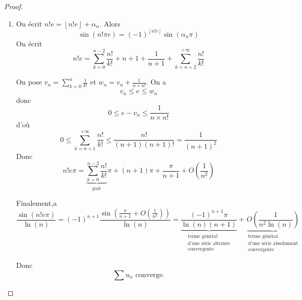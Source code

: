 \documentclass[12pt]{article}
\begin{document}
\begin{proof}
\begin{enumerate}
		\item On écrit $n!e=\left\lfloor n!e\right\rfloor+\alpha_{n}$.
		Alors 
		\begin{equation*}\sin(n!\pi e)=(-1)^{\left\lfloor n!e\right\rfloor}\sin(\alpha_{n}\pi)\end{equation*}
		On écrit 
		\begin{equation*}n!e=\sum_{k=0}^{n-2}\frac{n!}{k!}+n+1+\frac{1}{n+1}+\sum_{k=n+2}^{+\infty}\frac{n!}{k!}\end{equation*}

		On pose $v_{n}=\sum_{k=0}^{n}\frac{1}{k!}$ et $w_{n}=v_{n}+\frac{1}{n\times n!}$. On a 
		\begin{equation*}v_{n}\leqslant e\leqslant w_{n}\end{equation*}
		donc 
		\begin{equation*}0\leqslant e-v_{n}\leqslant\frac{1}{n\times n!}\end{equation*}
		d'où
		\begin{equation*}0\leqslant \sum_{k=n+1}^{+\infty}\frac{n!}{k!}\leqslant\frac{n!}{(n+1)(n+1)!}=\frac{1}{(n+1)^{2}}\end{equation*}
		Donc 
		\begin{equation*}n!e\pi = \underbrace{\sum_{k=0}^{n-2}\frac{n!}{k!}}_{\text{pair}}\pi+(n+1)\pi+\frac{\pi}{n+1}+O\left(\frac{1}{n^{2}}\right)\end{equation*}

		Finalement,a
		\begin{equation*}\frac{\sin(n!e\pi)}{\ln(n)}=(-1)^{n+1}\frac{\sin\left(\frac{\pi}{n+1}+O\left(\frac{1}{n^{2}}\right)\right)}{\ln(n)}=\underbrace{\frac{(-1)^{n+1}\pi}{\ln(n)(n+1)}}_{\substack{\text{terme général}\\\text{d'une série alternée}\\\text{convergente}}}+\underbrace{O\left(\frac{1}{n^{2}\ln(n)}\right)}_{\substack{\text{terme général}\\\text{d'une série absolument}\\\text{convergente}}}\end{equation*}

		Donc 
		\begin{equation*}\boxed{\sum u_{n}\text{ converge.}}\end{equation*}
	\end{enumerate}
\end{proof}
\end{document}

